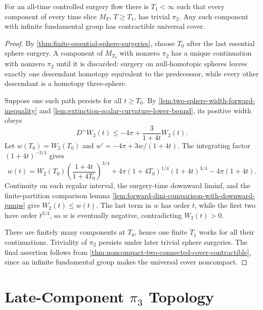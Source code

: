\begin{theorem}
\label{thm:eventual-pi2-vanishing}
\notready
For an all-time controlled surgery flow there is $T_1<\infty$ such that every
component of every time slice $M_T$, $T\ge T_1$, has trivial $\pi_2$.  Any
such component with infinite fundamental group has contractible universal
cover.
\end{theorem}

\begin{proof}
By \ref{thm:finite-essential-sphere-surgeries}, choose $T_0$ after the last
essential sphere surgery.  A component of $M_{T_0}$ with nonzero $\pi_2$ has
a unique continuation with nonzero $\pi_2$ until it is discarded: surgery on
null-homotopic spheres leaves exactly one descendant homotopy equivalent to
the predecessor, while every other descendant is a homotopy three-sphere.

Suppose one such path persists for all $t\ge T_0$.  By
\ref{lem:two-sphere-width-forward-inequality} and
\ref{lem:extinction-scalar-curvature-lower-bound}, its positive width obeys
\[
 D^+W_2(t)\le-4\pi+\frac3{1+4t}W_2(t).
\]
Let $w(T_0)=W_2(T_0)$ and
$w'=-4\pi+3w/(1+4t)$.  The integrating factor
$(1+4t)^{-3/4}$ gives
\[
 w(t)=W_2(T_0)\left(\frac{1+4t}{1+4T_0}\right)^{3/4}
 +4\pi(1+4T_0)^{1/4}(1+4t)^{3/4}-4\pi(1+4t).
\]
Continuity on each regular interval, the surgery-time downward liminf, and
the finite-partition comparison lemma
\ref{lem:forward-dini-comparison-with-downward-jumps} give
$W_2(t)\le w(t)$.  The last term in
$w$ has order $t$, while the first two have order $t^{3/4}$, so $w$ is
eventually negative, contradicting $W_2(t)>0$.

There are finitely many components at $T_0$, hence one finite $T_1$ works for
all their continuations.  Triviality of $\pi_2$ persists under later trivial
sphere surgeries.  The final assertion follows from
\ref{thm:noncompact-two-connected-cover-contractible}, since an infinite
fundamental group makes the universal cover noncompact.
\end{proof}
\section{Late-Component \texorpdfstring{$\pi_3$}{pi3} Topology}

